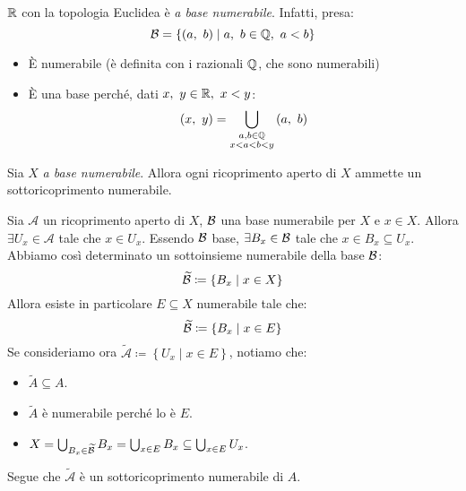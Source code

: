 \begin{example}
	$\mathbb{R}$ con la topologia Euclidea è \textit{a base numerabile}. Infatti, presa:
	\begin{equation*}
		\mathcal{B}=\left\{\left(a,\ b\right)\mid a,\ b\in \mathbb{Q},\ a<b\right\}
	\end{equation*}
	\begin{itemize}
		\item È numerabile (è definita con i razionali $\mathbb{Q}$, che sono numerabili)
		\item È una base perché, dati $x,\ y\in\realset,\ x<y$:
		\begin{equation*}
			\left(x,\ y\right)=\union_{\substack{a, b\in\rationalset\\ x<a<b<y}}\left(a,\ b\right)
		\end{equation*}
	\end{itemize}
\vspace{-6mm}
\end{example}
\begin{proposition}
Sia $X$ \textit{a base numerabile}. Allora ogni ricoprimento aperto di $X$ ammette un sottoricoprimento numerabile.
\end{proposition}
\begin{demonstration}
Sia $\mathcal{A}$ un ricoprimento aperto di $X$, $\mathcal{B}$ una base numerabile per $X$ e $x\in X$. Allora $\exists U_x\in\mathcal{A}$ tale che $x\in U_x$. Essendo $\mathcal{B}$ base, $\exists B_x\in\mathcal{B}$ tale che $x\in B_x\subseteq U_x$.\\
Abbiamo così determinato un sottoinsieme numerabile della base $\mathcal{B}$:
\begin{equation*}
\widetilde{\mathcal{B}}\coloneqq\left\{B_x\mid x\in X\right\}
\end{equation*}
Allora esiste in particolare $E\subseteq X$ numerabile tale che:
\begin{equation*}
\widetilde{\mathcal{B}}\coloneqq\left\{B_x\mid x\in E\right\}
\end{equation*}
Se consideriamo ora $\widetilde{\mathcal{A}}\coloneqq\left\{U_x\mid x\in E\right\}$, notiamo che:
\begin{itemize}
	\item $\widetilde{A}\subseteq A$.
	\item $\widetilde{A}$ è numerabile perché lo è $E$.
	\item $X=\mathop{{\bigcup}}\displaylimits_{B_x\in\widetilde{\mathcal{B}}}B_x=\mathop{{\bigcup}}\displaylimits_{x\in E}B_x\subseteq \mathop{{\bigcup}}\displaylimits_{x\in E}U_x $.
\end{itemize}
Segue che $\widetilde{\mathcal{A}}$ è un sottoricoprimento numerabile di $A$.
\end{demonstration}
